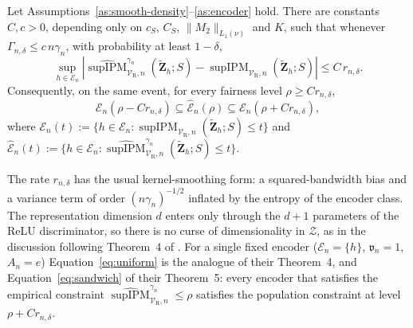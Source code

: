 \begin{theorem}
\label{thm:uniform}
Let Assumptions~\ref{as:smooth-density}--\ref{as:encoder} hold.  There are constants $C,c>0$, depending only on $c_S$, $C_S$, $\lVert M_2\rVert_{L_1(\nu)}$ and $K$, such that whenever $\Gamma_{n,\delta}\le c\,n\gamma_n$, with probability at least $1-\delta$,
\begin{equation}
  \sup_{h\in\mathcal{E}_n}
  \left|
    \widehat{\operatorname{supIPM}}^{\gamma_n}_{\mathcal{V}_{\mathrm{R}},n}
    (\widetilde{\mathbf{Z}}_h;S)
    -\operatorname{supIPM}_{\mathcal{V}_{\mathrm{R}},n}
    (\widetilde{\mathbf{Z}}_h;S)
  \right|
  \le C\,r_{n,\delta} .
  \label{eq:uniform}
\end{equation}
Consequently, on the same event, for every fairness level $\rho\ge Cr_{n,\delta}$,
\begin{equation}
  \mathcal{E}_n(\rho-Cr_{n,\delta})
  \subseteq\widehat{\mathcal{E}}_n(\rho)
  \subseteq\mathcal{E}_n(\rho+Cr_{n,\delta}),
  \label{eq:sandwich}
\end{equation}
where $\mathcal{E}_n(t):=\{h\in\mathcal{E}_n:\operatorname{supIPM}_{\mathcal{V}_{\mathrm{R}},n}(\widetilde{\mathbf{Z}}_h;S)\le t\}$ and $\widehat{\mathcal{E}}_n(t):=\{h\in\mathcal{E}_n:\widehat{\operatorname{supIPM}}^{\gamma_n}_{\mathcal{V}_{\mathrm{R}},n}(\widetilde{\mathbf{Z}}_h;S)\le t\}$.
\end{theorem}

The rate $r_{n,\delta}$ has the usual kernel-smoothing form: a squared-bandwidth bias and a variance term of order $(n\gamma_n)^{-1/2}$ inflated by the entropy of the encoder class.  The representation dimension $d$ enters only through the $d+1$ parameters of the ReLU discriminator, so there is no curse of dimensionality in $\mathcal{Z}$, as in the discussion following Theorem~4 of \citet{kong2025fair}.  For a single fixed encoder ($\mathcal{E}_n=\{h\}$, $\mathfrak{v}_n=1$, $A_n=e$) Equation~\ref{eq:uniform} is the analogue of their Theorem~4, and Equation~\ref{eq:sandwich} of their Theorem~5: every encoder that satisfies the empirical constraint $\widehat{\operatorname{supIPM}}^{\gamma_n}_{\mathcal{V}_{\mathrm{R}},n}\le\rho$ satisfies the population constraint at level $\rho+Cr_{n,\delta}$.

